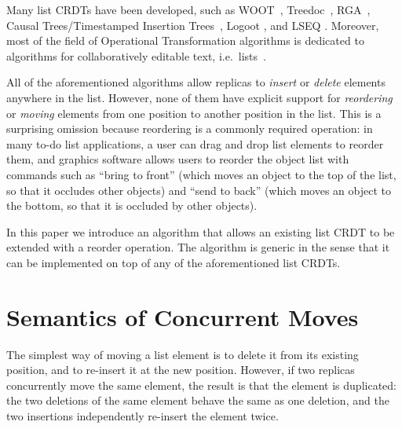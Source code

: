 \documentclass[sigplan,10pt]{acmart}
\begin{document}
Many list CRDTs have been developed, such as WOOT~\cite{Oster:2006wj}, Treedoc~\cite{Preguica:2009fz}, RGA~\cite{Roh:2011dw}, Causal Trees/Timestamped Insertion Trees~\cite{Grishchenko:2014eh,Attiya:2016kh}, Logoot \cite{Weiss:2009ht,Weiss:2010hx}, and LSEQ \cite{Nedelec:2013ky,Nedelec:2016eo}.
Moreover, most of the field of Operational Transformation algorithms is dedicated to algorithms for collaboratively editable text, i.e.\ lists~\cite{Ellis:1989ue,Nichols:1995fd,Ressel:1996wx,Sun:1998vf,Oster:2006tr}.

All of the aforementioned algorithms allow replicas to \emph{insert} or \emph{delete} elements anywhere in the list.
However, none of them have explicit support for \emph{reordering} or \emph{moving} elements from one position to another position in the list.
This is a surprising omission because reordering is a commonly required operation: in many to-do list applications, a user can drag and drop list elements to reorder them, and graphics software allows users to reorder the object list with commands such as ``bring to front'' (which moves an object to the top of the list, so that it occludes other objects) and ``send to back'' (which moves an object to the bottom, so that it is occluded by other objects).

In this paper we introduce an algorithm that allows an existing list CRDT to be extended with a reorder operation.
The algorithm is generic in the sense that it can be implemented on top of any of the aforementioned list CRDTs.

\section{Semantics of Concurrent Moves}\label{sec:semantics}

The simplest way of moving a list element is to delete it from its existing position, and to re-insert it at the new position.
However, if two replicas concurrently move the same element, the result is that the element is duplicated: the two deletions of the same element behave the same as one deletion, and the two insertions independently re-insert the element twice.

\end{document}
